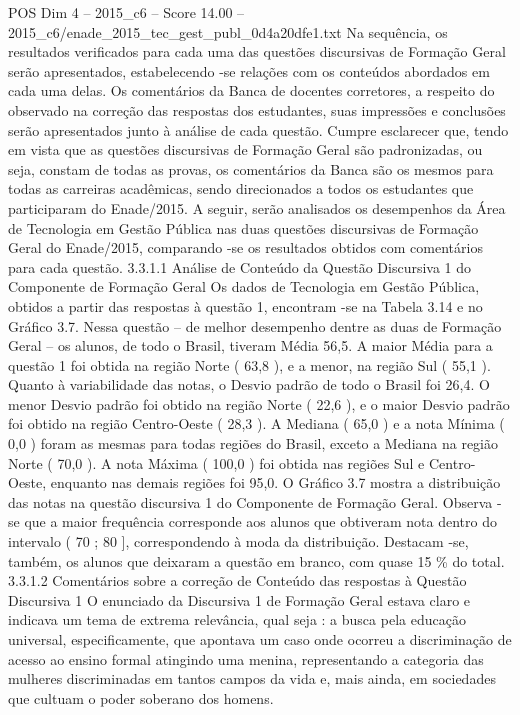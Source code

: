 \begin{textsample}{POS Dim 4 – 2015\_c6 – Score 14.00 – 2015\_c6/enade\_2015\_tec\_gest\_publ\_0d4a20dfe1.txt}
Na sequência, os resultados verificados para cada uma das questões discursivas de Formação Geral serão apresentados, estabelecendo -se relações com os conteúdos abordados em cada uma delas.
Os comentários da Banca de docentes corretores, a respeito do observado na correção das respostas dos estudantes, suas impressões e conclusões serão apresentados junto à análise de cada questão.
Cumpre esclarecer que, tendo em vista que as questões discursivas de Formação Geral são padronizadas, ou seja, constam de todas as provas, os comentários da Banca são os mesmos para todas as carreiras acadêmicas, sendo direcionados a todos os estudantes que participaram do Enade/2015.
A seguir, serão analisados os desempenhos da Área de Tecnologia em Gestão Pública nas duas questões discursivas de Formação Geral do Enade/2015, comparando -se os resultados obtidos com comentários para cada questão. 3.3.1.1 Análise de Conteúdo da Questão Discursiva 1 do Componente de Formação Geral Os dados de Tecnologia em Gestão Pública, obtidos a partir das respostas à questão 1, encontram -se na Tabela 3.14 e no Gráfico 3.7.
Nessa questão – de melhor desempenho dentre as duas de Formação Geral – os alunos, de todo o Brasil, tiveram Média 56,5.
A maior Média para a questão 1 foi obtida na região Norte ( 63,8 ), e a menor, na região Sul ( 55,1 ).
Quanto à variabilidade das notas, o Desvio padrão de todo o Brasil foi 26,4.
O menor Desvio padrão foi obtido na região Norte ( 22,6 ), e o maior Desvio padrão foi obtido na região Centro-Oeste ( 28,3 ).
A Mediana ( 65,0 ) e a nota Mínima ( 0,0 ) foram as mesmas para todas regiões do Brasil, exceto a Mediana na região Norte ( 70,0 ).
A nota Máxima ( 100,0 ) foi obtida nas regiões Sul e Centro-Oeste, enquanto nas demais regiões foi 95,0.
O Gráfico 3.7 mostra a distribuição das notas na questão discursiva 1 do Componente de Formação Geral.
Observa -se que a maior frequência corresponde aos alunos que obtiveram nota dentro do intervalo ( 70 ; 80 ], correspondendo à moda da distribuição.
Destacam -se, também, os alunos que deixaram a questão em branco, com quase 15 \% do total. 3.3.1.2 Comentários sobre a correção de Conteúdo das respostas à Questão Discursiva 1 O enunciado da Discursiva 1 de Formação Geral estava claro e indicava um tema de extrema relevância, qual seja : a busca pela educação universal, especificamente, que apontava um caso onde ocorreu a discriminação de acesso ao ensino formal atingindo uma menina, representando a categoria das mulheres discriminadas em tantos campos da vida e, mais ainda, em sociedades que cultuam o poder soberano dos homens.

\end{textsample}
